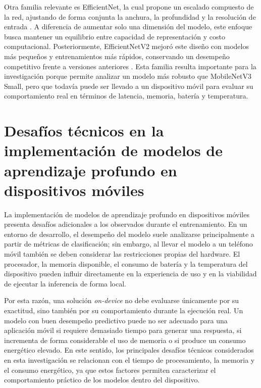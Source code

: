 Otra familia relevante es EfficientNet, la cual propone un escalado compuesto de la red, ajustando de forma conjunta la anchura, la
profundidad y la resolución de entrada \cite{tan2020efficientnetrethinkingmodelscaling}. A diferencia de aumentar solo una dimensión del
modelo, este enfoque busca mantener un equilibrio entre capacidad de representación y costo computacional. Posteriormente, EfficientNetV2
mejoró este diseño con modelos más pequeños y entrenamientos más rápidos, conservando un desempeño competitivo frente a versiones
anteriores \cite{DBLP:journals/corr/abs-2104-00298}. Esta familia resulta importante para la investigación porque permite analizar un
modelo más robusto que MobileNetV3 Small, pero que todavía puede ser llevado a un dispositivo móvil para evaluar su comportamiento real
en términos de latencia, memoria, batería y temperatura.

\section{Desafíos técnicos en la implementación de modelos de aprendizaje profundo en dispositivos móviles}

La implementación de modelos de aprendizaje profundo en dispositivos móviles presenta desafíos adicionales a los observados durante el
entrenamiento. En un entorno de desarrollo, el desempeño del modelo suele analizarse principalmente a partir de métricas de clasificación;
sin embargo, al llevar el modelo a un teléfono móvil también se deben considerar las restricciones propias del hardware. El procesador,
la memoria disponible, el consumo de batería y la temperatura del dispositivo pueden influir directamente en la experiencia de uso y en
la viabilidad de ejecutar la inferencia de forma local.

Por esta razón, una solución \textit{on-device} no debe evaluarse únicamente por su exactitud, sino también por su comportamiento durante
la ejecución real. Un modelo con buen desempeño predictivo puede no ser adecuado para una aplicación móvil si requiere demasiado tiempo
para generar una respuesta, si incrementa de forma considerable el uso de memoria o si produce un consumo energético elevado. En este
sentido, los principales desafíos técnicos considerados en esta investigación se relacionan con el tiempo de procesamiento, la memoria y
el consumo energético, ya que estos factores permiten caracterizar el comportamiento práctico de los modelos dentro del dispositivo.

